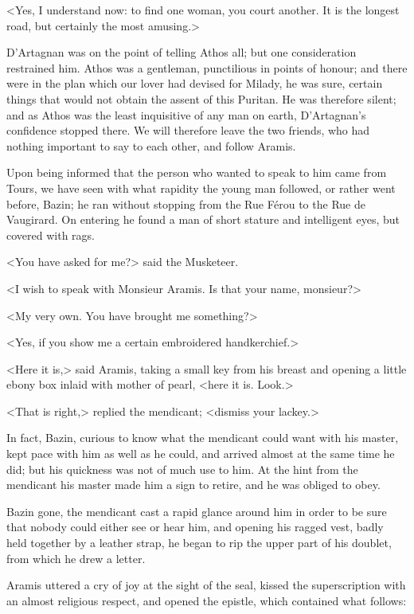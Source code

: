 <Yes, I understand now: to find one woman, you court another. It is the longest road, but certainly the most amusing.> 

D'Artagnan was on the point of telling Athos all; but one consideration restrained him. Athos was a gentleman, punctilious in points of honour; and there were in the plan which our lover had devised for Milady, he was sure, certain things that would not obtain the assent of this Puritan. He was therefore silent; and as Athos was the least inquisitive of any man on earth, D'Artagnan's confidence stopped there. We will therefore leave the two friends, who had nothing important to say to each other, and follow Aramis. 

Upon being informed that the person who wanted to speak to him came from Tours, we have seen with what rapidity the young man followed, or rather went before, Bazin; he ran without stopping from the Rue Férou to the Rue de Vaugirard. On entering he found a man of short stature and intelligent eyes, but covered with rags. 

<You have asked for me?> said the Musketeer. 

<I wish to speak with Monsieur Aramis. Is that your name, monsieur?> 

<My very own. You have brought me something?> 

<Yes, if you show me a certain embroidered handkerchief.> 

<Here it is,> said Aramis, taking a small key from his breast and opening a little ebony box inlaid with mother of pearl, <here it is. Look.> 

<That is right,> replied the mendicant; <dismiss your lackey.> 

In fact, Bazin, curious to know what the mendicant could want with his master, kept pace with him as well as he could, and arrived almost at the same time he did; but his quickness was not of much use to him. At the hint from the mendicant his master made him a sign to retire, and he was obliged to obey. 

Bazin gone, the mendicant cast a rapid glance around him in order to be sure that nobody could either see or hear him, and opening his ragged vest, badly held together by a leather strap, he began to rip the upper part of his doublet, from which he drew a letter. 

Aramis uttered a cry of joy at the sight of the seal, kissed the superscription with an almost religious respect, and opened the epistle, which contained what follows:

